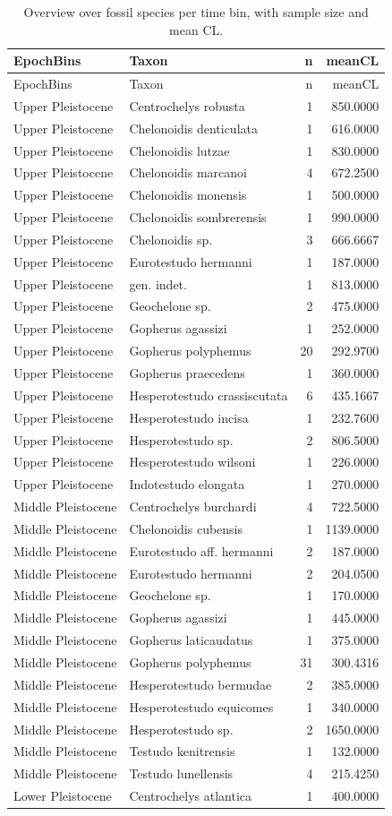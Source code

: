 \documentclass[]{article}
\begin{document}
\begin{longtable}[]{@{}llrr@{}}
\caption{Overview over fossil species per time bin, with sample size and
mean CL.}\tabularnewline
\toprule
EpochBins & Taxon & n & meanCL\tabularnewline
\midrule
\endfirsthead
\toprule
EpochBins & Taxon & n & meanCL\tabularnewline
\midrule
\endhead
Upper Pleistocene & Centrochelys robusta & 1 & 850.0000\tabularnewline
Upper Pleistocene & Chelonoidis denticulata & 1 &
616.0000\tabularnewline
Upper Pleistocene & Chelonoidis lutzae & 1 & 830.0000\tabularnewline
Upper Pleistocene & Chelonoidis marcanoi & 4 & 672.2500\tabularnewline
Upper Pleistocene & Chelonoidis monensis & 1 & 500.0000\tabularnewline
Upper Pleistocene & Chelonoidis sombrerensis & 1 &
990.0000\tabularnewline
Upper Pleistocene & Chelonoidis sp. & 3 & 666.6667\tabularnewline
Upper Pleistocene & Eurotestudo hermanni & 1 & 187.0000\tabularnewline
Upper Pleistocene & gen. indet. & 1 & 813.0000\tabularnewline
Upper Pleistocene & Geochelone sp. & 2 & 475.0000\tabularnewline
Upper Pleistocene & Gopherus agassizi & 1 & 252.0000\tabularnewline
Upper Pleistocene & Gopherus polyphemus & 20 & 292.9700\tabularnewline
Upper Pleistocene & Gopherus praecedens & 1 & 360.0000\tabularnewline
Upper Pleistocene & Hesperotestudo crassiscutata & 6 &
435.1667\tabularnewline
Upper Pleistocene & Hesperotestudo incisa & 1 & 232.7600\tabularnewline
Upper Pleistocene & Hesperotestudo sp. & 2 & 806.5000\tabularnewline
Upper Pleistocene & Hesperotestudo wilsoni & 1 & 226.0000\tabularnewline
Upper Pleistocene & Indotestudo elongata & 1 & 270.0000\tabularnewline
Middle Pleistocene & Centrochelys burchardi & 4 &
722.5000\tabularnewline
Middle Pleistocene & Chelonoidis cubensis & 1 & 1139.0000\tabularnewline
Middle Pleistocene & Eurotestudo aff. hermanni & 2 &
187.0000\tabularnewline
Middle Pleistocene & Eurotestudo hermanni & 2 & 204.0500\tabularnewline
Middle Pleistocene & Geochelone sp. & 1 & 170.0000\tabularnewline
Middle Pleistocene & Gopherus agassizi & 1 & 445.0000\tabularnewline
Middle Pleistocene & Gopherus laticaudatus & 1 & 375.0000\tabularnewline
Middle Pleistocene & Gopherus polyphemus & 31 & 300.4316\tabularnewline
Middle Pleistocene & Hesperotestudo bermudae & 2 &
385.0000\tabularnewline
Middle Pleistocene & Hesperotestudo equicomes & 1 &
340.0000\tabularnewline
Middle Pleistocene & Hesperotestudo sp. & 2 & 1650.0000\tabularnewline
Middle Pleistocene & Testudo kenitrensis & 1 & 132.0000\tabularnewline
Middle Pleistocene & Testudo lunellensis & 4 & 215.4250\tabularnewline
Lower Pleistocene & Centrochelys atlantica & 1 & 400.0000\tabularnewline

\end{longtable}
\end{document}
